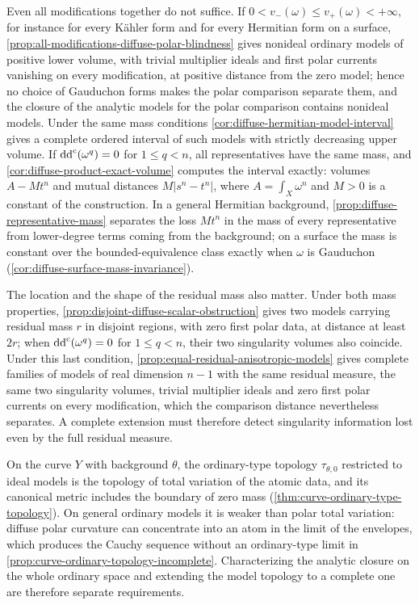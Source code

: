Even all modifications together do not suffice. If $0<v_-(\omega)\leq v_+(\omega)<+\infty$, for instance for every K\"ahler form and for every Hermitian form on a surface, \cref{prop:all-modifications-diffuse-polar-blindness} gives nonideal ordinary models of positive lower volume, with trivial multiplier ideals and first polar currents vanishing on every modification, at positive distance from the zero model; hence no choice of Gauduchon forms makes the polar comparison separate them, and the closure of the analytic models for the polar comparison contains nonideal models. Under the same mass conditions \cref{cor:diffuse-hermitian-model-interval} gives a complete ordered interval of such models with strictly decreasing upper volume. If $\mathrm{dd}^{\mathrm{c}}(\omega^q)=0$ for $1\leq q<n$, all representatives have the same mass, and \cref{cor:diffuse-product-exact-volume} computes the interval exactly: volumes $A-Mt^n$ and mutual distances $M|s^n-t^n|$, where $A=\int_X\omega^n$ and $M>0$ is a constant of the construction. In a general Hermitian background, \cref{prop:diffuse-representative-mass} separates the loss $Mt^n$ in the mass of every representative from lower-degree terms coming from the background; on a surface the mass is constant over the bounded-equivalence class exactly when $\omega$ is Gauduchon (\cref{cor:diffuse-surface-mass-invariance}).

The location and the shape of the residual mass also matter. Under both mass properties, \cref{prop:disjoint-diffuse-scalar-obstruction} gives two models carrying residual mass $r$ in disjoint regions, with zero first polar data, at distance at least $2r$; when $\mathrm{dd}^{\mathrm{c}}(\omega^q)=0$ for $1\leq q<n$, their two singularity volumes also coincide. Under this last condition, \cref{prop:equal-residual-anisotropic-models} gives complete families of models of real dimension $n-1$ with the same residual measure, the same two singularity volumes, trivial multiplier ideals and zero first polar currents on every modification, which the comparison distance nevertheless separates. A complete extension must therefore detect singularity information lost even by the full residual measure.

On the curve $Y$ with background $\theta$, the ordinary-type topology $\tau_{\theta,0}$ restricted to ideal models is the topology of total variation of the atomic data, and its canonical metric includes the boundary of zero mass (\cref{thm:curve-ordinary-type-topology}). On general ordinary models it is weaker than polar total variation: diffuse polar curvature can concentrate into an atom in the limit of the envelopes, which produces the Cauchy sequence without an ordinary-type limit in \cref{prop:curve-ordinary-topology-incomplete}. Characterizing the analytic closure on the whole ordinary space and extending the model topology to a complete one are therefore separate requirements.

